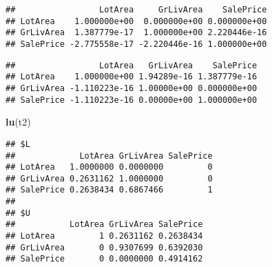 \documentclass[]{article}
\newenvironment{Shaded}{\begin{snugshade}}{\end{snugshade}}
\newcommand{\KeywordTok}[1]{\textcolor[rgb]{0.13,0.29,0.53}{\textbf{#1}}}
\newcommand{\StringTok}[1]{\textcolor[rgb]{0.31,0.60,0.02}{#1}}
\newcommand{\OperatorTok}[1]{\textcolor[rgb]{0.81,0.36,0.00}{\textbf{#1}}}
\newcommand{\NormalTok}[1]{#1}
\begin{document}
\begin{Shaded}
\end{Shaded}

\begin{verbatim}
##                 LotArea     GrLivArea    SalePrice
## LotArea    1.000000e+00  0.000000e+00 0.000000e+00
## GrLivArea  1.387779e-17  1.000000e+00 2.220446e-16
## SalePrice -2.775558e-17 -2.220446e-16 1.000000e+00
\end{verbatim}

\begin{Shaded}
\end{Shaded}

\begin{verbatim}
##                 LotArea   GrLivArea    SalePrice
## LotArea    1.000000e+00 1.94289e-16 1.387779e-16
## GrLivArea -1.110223e-16 1.00000e+00 0.000000e+00
## SalePrice -1.110223e-16 0.00000e+00 1.000000e+00
\end{verbatim}

\begin{Shaded}
\begin{Highlighting}[]
\KeywordTok{lu}\NormalTok{(t2)}
\end{Highlighting}
\end{Shaded}

\begin{verbatim}
## $L
##             LotArea GrLivArea SalePrice
## LotArea   1.0000000 0.0000000         0
## GrLivArea 0.2631162 1.0000000         0
## SalePrice 0.2638434 0.6867466         1
## 
## $U
##           LotArea GrLivArea SalePrice
## LotArea         1 0.2631162 0.2638434
## GrLivArea       0 0.9307699 0.6392030
## SalePrice       0 0.0000000 0.4914162
\end{verbatim}
\end{document}
